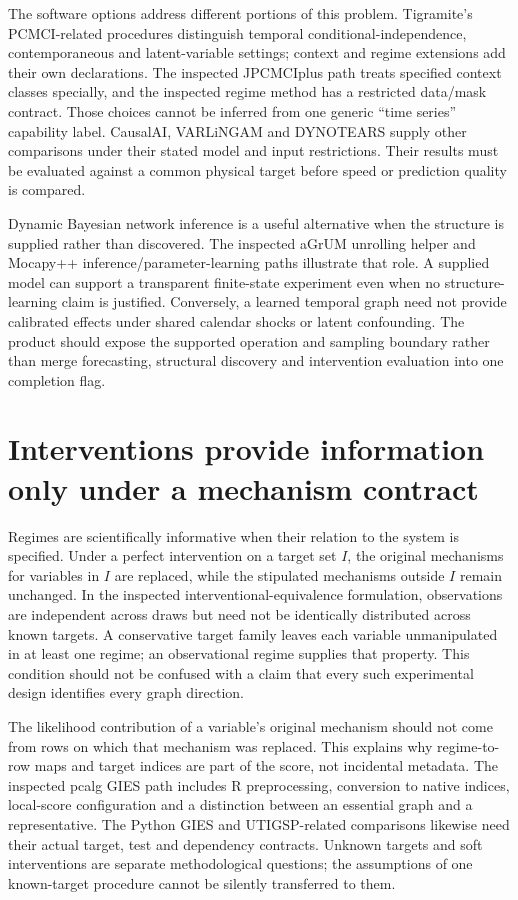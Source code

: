 The software options address different portions of this problem. Tigramite's
PCMCI-related procedures distinguish temporal conditional-independence,
contemporaneous and latent-variable settings; context and regime extensions
add their own declarations. The inspected JPCMCIplus path treats specified
context classes specially, and the inspected regime method has a restricted
data/mask contract. Those choices cannot be inferred from one generic
``time series'' capability label. CausalAI, VARLiNGAM and DYNOTEARS supply
other comparisons under their stated model and input restrictions. Their
results must be evaluated against a common physical target before speed or
prediction quality is compared. \citep{exec14_pt_tigramite,exec14_pt_causalai,exec14_pt_causalnex,exec13_pydisc_lingam}

Dynamic Bayesian network inference is a useful alternative when the structure
is supplied rather than discovered. The inspected aGrUM unrolling helper and
Mocapy++ inference/parameter-learning paths illustrate that role. A supplied
model can support a transparent finite-state experiment even when no
structure-learning claim is justified. Conversely, a learned temporal graph
need not provide calibrated effects under shared calendar shocks or latent
confounding. The product should expose the supported operation and sampling
boundary rather than merge forecasting, structural discovery and intervention
evaluation into one completion flag. \citep{exec16_ct_agrum,exec16_ct_mocapy,exec16_ct_sdbn}

\section{Interventions provide information only under a mechanism contract}

Regimes are scientifically informative when their relation to the system is
specified. Under a perfect intervention on a target set $I$, the original
mechanisms for variables in $I$ are replaced, while the stipulated mechanisms
outside $I$ remain unchanged. In the inspected interventional-equivalence
formulation, observations are independent across draws but need not be
identically distributed across known targets. A conservative target family
leaves each variable unmanipulated in at least one regime; an observational
regime supplies that property. This condition should not be confused with a
claim that every such experimental design identifies every graph direction.
\citep{exec14_pt_paper_gies}

The likelihood contribution of a variable's original mechanism should not
come from rows on which that mechanism was replaced. This explains why
regime-to-row maps and target indices are part of the score, not incidental
metadata. The inspected pcalg GIES path includes R preprocessing, conversion
to native indices, local-score configuration and a distinction between an
essential graph and a representative. The Python GIES and UTIGSP-related
comparisons likewise need their actual target, test and dependency contracts.
Unknown targets and soft interventions are separate methodological questions;
the assumptions of one known-target procedure cannot be silently transferred
to them. \citep{exec16_ct_pcalg,exec14_pt_gies,exec14_pt_causaldag}

